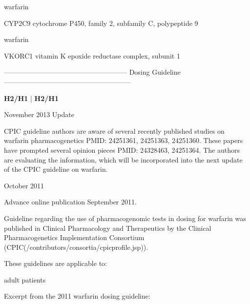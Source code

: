 \documentclass{resume} %
\begin{document}
\begin{rSection}{ warfarin }
\begin{rSubsection}{ CYP2C9 }{ cytochrome P450, family 2, subfamily C, polypeptide 9 }{}{}
\end{rSubsection}
\begin{rSection}{ warfarin }
\item[]
\begin{rSubsection}{ VKORC1 }{ vitamin K epoxide reductase complex, subunit 1 }{}{}
\item[]
\item[] ------------------------------------------------------ Dosing Guideline --------------------------------------------------------\newline
\item[]
\item[] \textbf{ H2/H1 } | \textbf{ H2/H1 }
\item November 2013 Update
 \newline
\item CPIC guideline authors are aware of several recently published studies on warfarin pharmacogenetics PMID: 24251361, 24251363, 24251360. These papers have prompted several opinion pieces PMID: 24328463, 24251364. The authors are evaluating the information, which will be incorporated into the next update of the CPIC guideline on warfarin.
 \newline
\item October 2011
 \newline
\item Advance online publication September 2011. 
 \newline
\item Guideline regarding the use of pharmacogenomic tests in dosing for warfarin was published in Clinical Pharmacology and Therapeutics by the Clinical Pharmacogenetics Implementation Consortium (CPIC(/contributors/consortia/cpicprofile.jsp)).  
 \newline
\item These guidelines are applicable to:
 \newline
\item adult patients
 \newline
\item Excerpt from the 2011 warfarin dosing guideline:
 \newline

\end{rSubsection}
\end{rSection}
\end{rSection}
\end{document}
